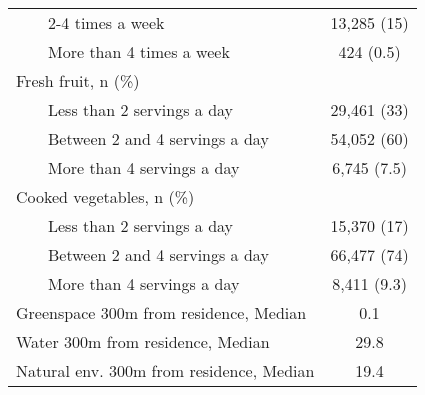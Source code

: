 \begin{table}[!t]
\begin{tabular*}{\linewidth}{@{\extracolsep{\fill}}lc}
    2-4 times a week & 13,285 (15) \\ 
    More than 4 times a week & 424 (0.5) \\ 
Fresh fruit, n (\%) &  \\ 
    Less than 2 servings a day & 29,461 (33) \\ 
    Between 2 and 4 servings a day & 54,052 (60) \\ 
    More than 4 servings a day & 6,745 (7.5) \\ 
Cooked vegetables, n (\%) &  \\ 
    Less than 2 servings a day & 15,370 (17) \\ 
    Between 2 and 4 servings a day & 66,477 (74) \\ 
    More than 4 servings a day & 8,411 (9.3) \\ 
Greenspace 300m from residence, Median & 0.1 \\ 
Water 300m from residence, Median & 29.8 \\ 
Natural env. 300m from residence, Median & 19.4 \\ 
\bottomrule
\end{tabular*}
\end{table}
